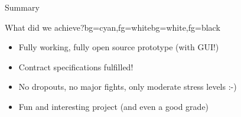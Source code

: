 \begin{frame}{Summary}
\begin{variableblock}{What did we achieve?}{bg=cyan,fg=white}{bg=white,fg=black}
{
\begin{itemize}
	
	\item[\textcolor{green}
	{\Checkmark}] Fully working, fully open source prototype (with GUI!)
	
	\item[\textcolor{green}
	{\Checkmark}] Contract specifications fulfilled!
	
	\item[\textcolor{green}{\Checkmark}] No dropouts, no major fights, only moderate stress levels :-) 
	
	\item[\textcolor{green}{\Checkmark}] Fun and interesting project (and even a good grade)


\end{itemize}
}
\end{variableblock}
\end{frame}








